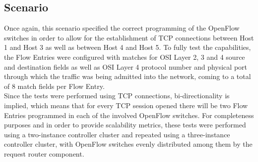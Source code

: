 \subsection{Scenario}
\label{subsection:performance-tests-scenario}
Once again, this scenario specified the correct programming of the OpenFlow switches in order to allow for the establishment of \gls{TCP} connections between Host 1 and Host 3 as well as between Host 4 and Host 5.
To fully test the capabilities, the Flow Entries were configured with matches for \gls{OSI} Layer 2, 3 and 4 source and destination fields as well as \gls{OSI} Layer 4 protocol number and physical port through which the traffic was being admitted into the network, coming to a total of 8 match fields per Flow Entry.\\
Since the tests were performed using \gls{TCP} connections, bi-directionality is implied, which means that for every \gls{TCP} session opened there will be two Flow Entries programmed in each of the involved OpenFlow switches.
For completeness purposes and in order to provide scalability metrics, these tests were performed using a two-instance controller cluster and repeated using a three-instance controller cluster, with OpenFlow switches evenly distributed among them by the request router component.
%
